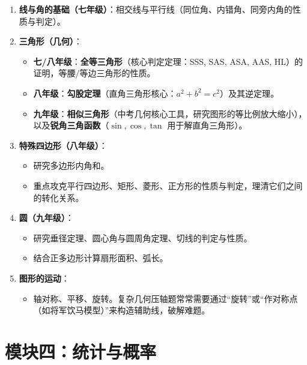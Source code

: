 \documentclass[11pt,a4paper]{ctexart}
\begin{document}
\begin{enumerate}[label=\textbf{\thesection.\arabic*}]
    \item \textbf{线与角的基础（七年级）}：相交线与平行线（同位角、内错角、同旁内角的性质与判定）。
    
    \item \textbf{三角形（几何）}：
    \begin{itemize}
        \item \textbf{七/八年级}：\textbf{全等三角形}（核心判定定理：SSS, SAS, ASA, AAS, HL）的证明，等腰/等边三角形的性质。
        \item \textbf{八年级}：\textbf{勾股定理}（直角三角形核心：$a^2 + b^2 = c^2$）及其逆定理。
        \item \textbf{九年级}：\textbf{相似三角形}（中考几何核心工具，研究图形的等比例放大缩小），以及\textbf{锐角三角函数}（$\sin, \cos, \tan$ 用于解直角三角形）。
    \end{itemize}
    
    \item \textbf{特殊四边形（八年级）}：
    \begin{itemize}
        \item 研究多边形内角和。
        \item 重点攻克平行四边形、矩形、菱形、正方形的性质与判定，理清它们之间的转化关系。
    \end{itemize}
    
    \item \textbf{圆（九年级）}：
    \begin{itemize}
        \item 研究垂径定理、圆心角与圆周角定理、切线的判定与性质。
        \item 结合正多边形计算扇形面积、弧长。
    \end{itemize}
    
    \item \textbf{图形的运动}：
    \begin{itemize}
        \item 轴对称、平移、旋转。复杂几何压轴题常常需要通过“旋转”或“作对称点（如将军饮马模型）”来构造辅助线，破解难题。
    \end{itemize}
\end{enumerate}

\section{模块四：统计与概率}
\end{document}
